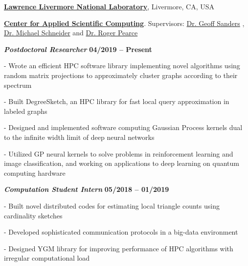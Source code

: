 \href{https://www.llnl.gov/}{\textbf{Lawrence Livermore National Laboratory}},
Livermore, CA, USA

\href{https://computation.llnl.gov/casc/}{\textbf{Center for Applied Scientific Computing}}.
Supervisors:               
\href{https://people.llnl.gov/sanders29}
{Dr. Geoff Sanders}
,
\href{https://pls.llnl.gov/people/staff-bios/physics/schneider-m}
{Dr. Michael Schneider}
and
\href{https://people.llnl.gov/pearce7}
{Dr. Roger Pearce}



\vspace{-0.5em}
\begin{outerlist}

\item[] \textbf{\textit{Postdoctoral Researcher}}%
\hfill \textbf{04/2019 -- Present}

\begin{innerlist}

\item[-] Wrote an efficient HPC software library implementing novel algorithms using random matrix projections to approximately cluster graphs according to their spectrum

\item[-] Built DegreeSketch, an HPC library for fast local query approximation in labeled graphs

\item[-] Designed and implemented software computing Gaussian Process kernels dual to the infinite width limit of deep neural networks

\item[-] Utilized GP neural kernels to solve problems in reinforcement learning and image classification, and working on applications to deep learning on quantum computing hardware

\end{innerlist}

\item[] \textbf{\textit{Computation Student Intern}}%
\hfill \textbf{05/2018 -- 01/2019}

\begin{innerlist}

\item[-] Built novel distributed codes for estimating local triangle counts using cardinality sketches

\item[-] Developed sophisticated communication protocols in a big-data environment

\item[-] Designed YGM library for improving performance of HPC algorithms with irregular computational load

\end{innerlist}
\end{outerlist}





